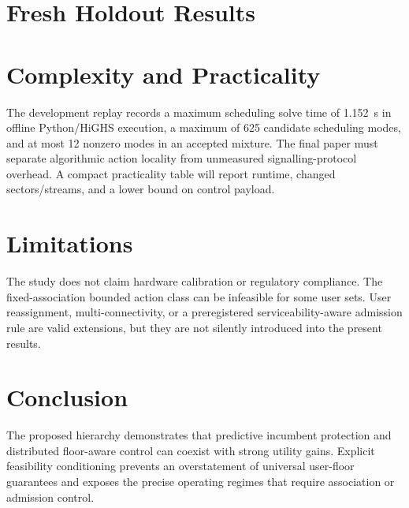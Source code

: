 \documentclass[journal]{IEEEtran}
\begin{document}
\section{Fresh Holdout Results}

\section{Complexity and Practicality}
The development replay records a maximum scheduling solve time of 1.152~s in offline Python/HiGHS execution, a maximum of 625 candidate scheduling modes, and at most 12 nonzero modes in an accepted mixture. The final paper must separate algorithmic action locality from unmeasured signalling-protocol overhead. A compact practicality table will report runtime, changed sectors/streams, and a lower bound on control payload.

\section{Limitations}
The study does not claim hardware calibration or regulatory compliance. The fixed-association bounded action class can be infeasible for some user sets. User reassignment, multi-connectivity, or a preregistered serviceability-aware admission rule are valid extensions, but they are not silently introduced into the present results.

\section{Conclusion}
The proposed hierarchy demonstrates that predictive incumbent protection and distributed floor-aware control can coexist with strong utility gains. Explicit feasibility conditioning prevents an overstatement of universal user-floor guarantees and exposes the precise operating regimes that require association or admission control.



\end{document}

